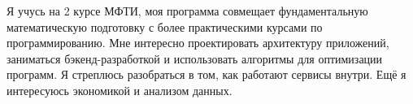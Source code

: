 Я учусь на 2 курсе МФТИ, моя программа совмещает фундаментальную математическую подготовку с более практическими курсами по программированию.
Мне интересно проектировать архитектуру приложений, заниматься бэкенд-разработкой и использовать алгоритмы для оптимизации программ.
Я стреплюсь разобраться в том, как работают сервисы внутри. 
Ещё я интересуюсь экономикой и анализом данных.